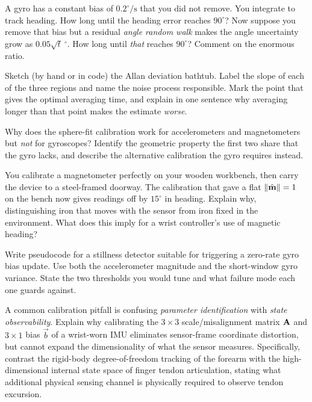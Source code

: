 \begin{exercise}
A gyro has a constant bias of $0.2^\circ/\mathrm{s}$ that you did not remove. You
integrate to track heading. How long until the heading error reaches $90^\circ$?
Now suppose you remove that bias but a residual \emph{angle random walk} makes the angle
uncertainty grow as $0.05\sqrt{t}\ ^\circ$. How long until \emph{that} reaches
$90^\circ$? Comment on the enormous ratio.
\end{exercise}

\begin{exercise}
Sketch (by hand or in code) the Allan deviation bathtub. Label the slope of each
of the three regions and name the noise process responsible. Mark the point that
gives the optimal averaging time, and explain in one sentence why averaging
longer than that point makes the estimate \emph{worse}.
\end{exercise}

\begin{exercise}
Why does the sphere-fit calibration work for accelerometers and magnetometers but
\emph{not} for gyroscopes? Identify the geometric property the first two share
that the gyro lacks, and describe the alternative calibration the gyro requires
instead.
\end{exercise}

\begin{exercise}
You calibrate a magnetometer perfectly on your wooden workbench, then carry the
device to a steel-framed doorway. The calibration that gave a flat
$\lVert\hat{\mathbf{m}}\rVert=1$ on the bench now gives readings off by $15^\circ$ in
heading. Explain why, distinguishing iron that moves with the sensor from iron
fixed in the environment. What does this imply for a wrist controller's use of
magnetic heading?
\end{exercise}

\begin{exercise}
Write pseudocode for a stillness detector suitable for triggering a zero-rate
gyro bias update. Use both the accelerometer magnitude and the short-window gyro
variance. State the two thresholds you would tune and what failure mode each one
guards against.
\end{exercise}

\begin{exercise}
A common calibration pitfall is confusing \emph{parameter identification} with
\emph{state observability}. Explain why calibrating the $3\times 3$ scale/misalignment
matrix $\mathbf{A}$ and $3\times 1$ bias $\vec{b}$ of a wrist-worn IMU eliminates sensor-frame
coordinate distortion, but cannot expand the dimensionality of what the sensor measures.
Specifically, contrast the rigid-body degree-of-freedom tracking of the forearm with
the high-dimensional internal state space of finger tendon articulation, stating what
additional physical sensing channel is physically required to observe tendon excursion.
\end{exercise}

